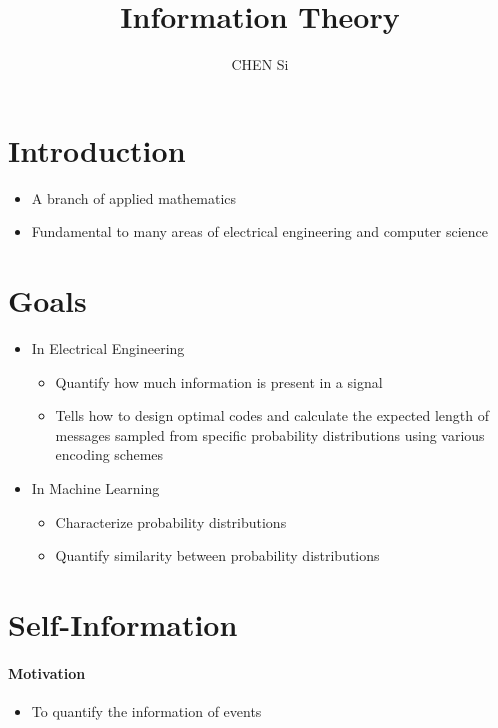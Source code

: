 \documentclass[12pt, a4paper]{article}
\title{Information Theory}
\author{CHEN Si}
\date{}
\begin{document}
 


\maketitle
\tableofcontents


\section{Introduction}

\begin{itemize}
    \item A branch of applied mathematics
    \item Fundamental to many areas of electrical engineering and computer science
\end{itemize}


\section{Goals}

\begin{itemize}
    \item In Electrical Engineering
        \begin{itemize}
            \item Quantify how much information is present in a signal 
            \item Tells how to design optimal codes and calculate the expected length of messages sampled from specific probability distributions using various encoding schemes
        \end{itemize}
    \item In Machine Learning
        \begin{itemize}
            \item Characterize probability distributions
            \item Quantify similarity between probability distributions
        \end{itemize}
\end{itemize}


\section{Self-Information}
\paragraph{Motivation}
\begin{itemize}
    \item To quantify the information of events
\end{itemize}
\end{document}

